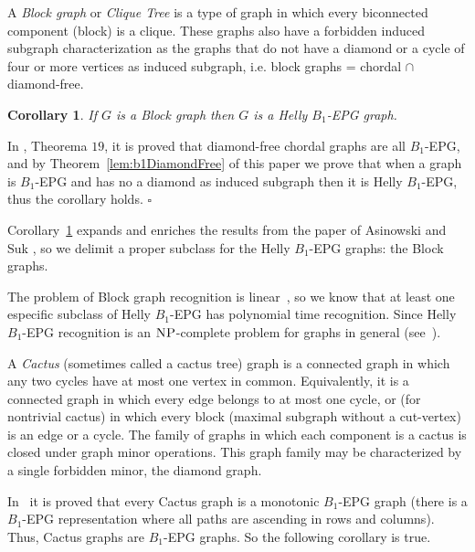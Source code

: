 \documentclass[9pt]{entcs}
\newtheorem{coro}{Corollary}[section]
\newcommand{\la}[1]{\textcolor{blue}{\sf{#1}}}%
\begin{document}
A \textit{Block graph} or \textit{Clique Tree} is a type of graph in which every biconnected component (block) is a clique. These graphs also have a forbidden induced subgraph characterization as the graphs that do not have a diamond or a cycle of four or more vertices as induced subgraph, i.e. block graphs = chordal $\cap$ diamond-free.


\begin{coro}\label{lem:cdf}
If $G$ is a Block graph then $G$ is a Helly $B_1$-EPG graph.
\end{coro}

\begin{pf}
In \cite{ries2009}, Theorema $19$, it is proved that diamond-free chordal graphs are all $B_1$-EPG, and by Theorem~\ref{lem:b1DiamondFree} of this paper we prove that when a graph is $B_1$-EPG and has no a diamond as induced subgraph then it is Helly $B_1$-EPG, thus the corollary holds.
 $\square$\end{pf} 

Corollary~\ref{lem:cdf} expands and enriches the results from the paper of Asinowski and Suk \cite{ries2009}, so we delimit a proper subclass for the Helly $B_1$-EPG graphs: the Block graphs.


The problem of Block graph recognition is linear~\cite{tarjan1972depth}, so we know that at least one especific subclass of Helly $B_1$-EPG has polynomial time recognition. Since Helly $B_1$-EPG recognition is an $\textsc{NP}$-complete problem for graphs in general (see~\cite{bornstein2019complexity}).


A \textit{Cactus} (sometimes called a cactus tree)  graph is a connected graph in which any two \la{induced} cycles have at most one vertex in common. Equivalently, it is a connected graph in which every edge belongs to at most one \la{induced} cycle, or (for nontrivial cactus) in which every block (maximal subgraph without a cut-vertex) is an edge or a cycle. The family of graphs in which each component is a cactus is closed under graph minor operations. This graph family may be characterized by a single forbidden minor, the diamond graph.
 
 In~\cite{cela2019monotonic} it is proved that every Cactus graph is a monotonic $B_1$-EPG graph (there is a $B_1$-EPG representation where all paths are ascending in rows and columns). Thus, Cactus graphs are $B_1$-EPG graphs. So the following corollary is true. 
 
\end{document}
